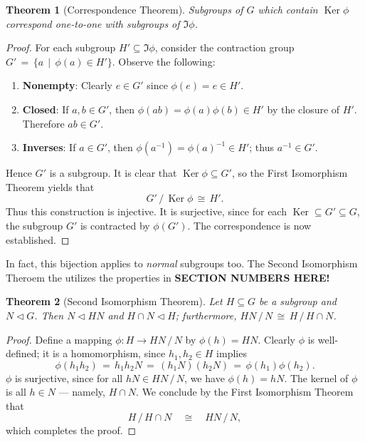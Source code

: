 \documentclass[11pt]{article}
\newtheorem{theorem}{Theorem}
\newcommand{\nsg}{\mathrel{\lhd}}
\newcommand{\Ker}{\operatorname{Ker}}
\begin{document}
\begin{adjustwidth}{0.5cm}{}
  \begin{theorem}[Correspondence Theorem]
    Subgroups of $G$ which contain $\Ker \phi$ correspond one-to-one with subgroups of $\Im \phi$.
  \end{theorem}
  \begin{proof}
    For each subgroup $H' \subseteq \Im \phi$, consider the contraction group $G' \, = \, \{ a \, \mid \, \phi(a) \in H' \}$. Observe the following:
    \begin{enumerate}
      \item \textbf{Nonempty}: Clearly $e \in G'$ since $\phi(e) = e \in H'$.
      \item \textbf{Closed}: If $a, b \in G'$, then $\phi(ab) = \phi(a) \phi(b) \in H'$ by the closure of $H'$. Therefore $ab \in G'$.
      \item \textbf{Inverses}: If $a \in G'$, then $\phi(a^{-1}) = \phi(a)^{-1} \in H'$; thus $a^{-1} \in G'$.
    \end{enumerate}
    Hence $G'$ is a subgroup. It is clear that $\Ker \phi \subseteq G'$, so the First Isomorphism Theorem yields that
    \[
      G' \, / \, \Ker \phi \, \cong \, H'.
    \]
    Thus this construction is injective. It is surjective, since for each $\Ker \subseteq G' \subseteq G$, the subgroup $G'$ is contracted by $\phi(G')$. The correspondence is now established.
  \end{proof}
\end{adjustwidth}

In fact, this bijection applies to \textit{normal} subgroups too. The Second Isomorphism Theroem the utilizes the properties in \textbf{SECTION NUMBERS HERE!}

\begin{adjustwidth}{0.5cm}{}
  \begin{theorem}[Second Isomorphism Theorem]
    Let $H \subseteq G$ be a subgroup and $N \nsg G$. Then $N \nsg HN$ and $H \cap N \nsg H$; furthermore, $HN \, / \, N \, \cong \, H \, / \, H \cap N$.
  \end{theorem}
  \begin{proof}
    Define a mapping $\phi : H \to HN \, / \, N$ by $\phi(h) = HN$. Clearly $\phi$ is well-defined; it is a homomorphism, since $h_{1}, h_{2} \in H$ implies
    \[
      \phi(h_{1}h_{2}) \, = \, h_{1}h_{2}N \, = \, (h_{1}N)(h_{2}N) \, = \, \phi(h_{1}) \phi(h_{2}).
    \]
    $\phi$ is surjective, since for all $hN \in HN \, / \, N$, we have $\phi(h) = hN$. The kernel of $\phi$ is all $h \in N$ --- namely, $H \cap N$. We conclude by the First Isomorphism Theorem that
    \[
      H \, / \, H \cap N \quad \cong \quad HN \, / \, N,
    \]
    which completes the proof.
  \end{proof}
\end{adjustwidth}
\end{document}
